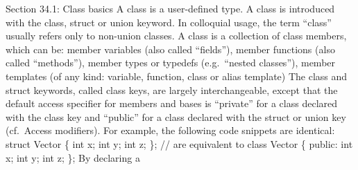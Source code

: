 Section 34.1: Class basics A class is a user-deﬁned type. A class is
introduced with the class, struct or union keyword. In colloquial usage,
the term ``class'' usually refers only to non-union classes. A class is
a collection of class members, which can be: member variables (also
called ``ﬁelds''), member functions (also called ``methods''), member
types or typedefs (e.g.~``nested classes''), member templates (of any
kind: variable, function, class or alias template) The class and struct
keywords, called class keys, are largely interchangeable, except that
the default access speciﬁer for members and bases is ``private'' for a
class declared with the class key and ``public'' for a class declared
with the struct or union key (cf.~Access modiﬁers). For example, the
following code snippets are identical: struct Vector \{ int x; int y;
int z; \}; // are equivalent to class Vector \{ public: int x; int y;
int z; \}; By declaring a
